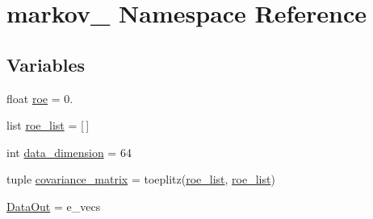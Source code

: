 \hypertarget{namespacemarkov__1}{\section{markov\-\_ \-Namespace \-Reference}
\label{namespacemarkov__1}
}
\subsection*{\-Variables}
\begin{DoxyCompactItemize}
\item 
float \hyperlink{namespacemarkov__1_a4a3eda3678257ab2cf6f06891c5ec22c}{roe} = 0.
\item 
list \hyperlink{namespacemarkov__1_ac6e549cf6d4d6df355d884b67fb19851}{roe\-\_\-list} = \mbox{[}$\,$\mbox{]}
\item 
int \hyperlink{namespacemarkov__1_a8134563a0c42390906c8914ad337e9d8}{data\-\_\-dimension} = 64
\item 
tuple \hyperlink{namespacemarkov__1_a7cc4d10a876ec07da21dbfd4d28e8684}{covariance\-\_\-matrix} = toeplitz(\hyperlink{namespacemarkov__1_ac6e549cf6d4d6df355d884b67fb19851}{roe\-\_\-list}, \hyperlink{namespacemarkov__1_ac6e549cf6d4d6df355d884b67fb19851}{roe\-\_\-list})
\item 
\hyperlink{namespacemarkov__1_a3744683663f02bff5cf245a674ab9b32}{\-Data\-Out} = e\-\_\-vecs
\end{DoxyCompactItemize}


